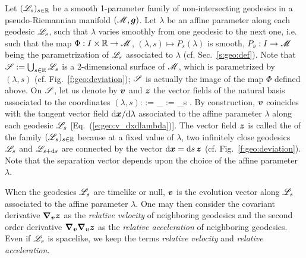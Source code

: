 Let $(\mathscr{L}_s)_{s\in\mathbb{R}}$ be a smooth 1-parameter family of non-intersecting geodesics in a
pseudo-Riemannian manifold $(\mathscr{M},\bm{g})$. Let $\lambda$ be an affine parameter
along each geodesic $\mathscr{L}_s$, such that $\lambda$ varies smoothly from one geodesic to the
next one, i.e. such that the map $\Phi: I\times \mathbb{R}\to \mathscr{M}$,
$(\lambda,s) \mapsto P_s(\lambda)$ is smooth, $P_s: I \to \mathscr{M}$ being the parametrization
of $\mathscr{L}_s$ associated to $\lambda$ (cf. Sec.~\ref{s:geo:def}). Note that
$\mathscr{S} := \bigcup_{s\in\mathbb{R}} \mathscr{L}_s$ is a
2-dimensional surface of $\mathscr{M}$, which is parametrized by $(\lambda,s)$
(cf. Fig.~\ref{f:geo:deviation});
$\mathscr{S}$ is actually the image of the map $\Phi$ defined above. On $\mathscr{S}$,
let us denote by $\bm{v}$ and $\bm{z}$ the vector fields of the natural basis
associated to the coordinates $(\lambda,s)$:
\be
     := \wpar_\lambda   \qand {} := \wpar_s .
\ee
By construction, $\bm{v}$
coincides with the tangent vector field $\mathrm{d}\bm{x}/\mathrm{d}\lambda$ associated to
the affine parameter $\lambda$ along each geodesic $\mathscr{L}_s$ [Eq.~(\ref{e:geo:v_dxdlambda})].
The vector field $\bm{z}$ is called the  of the
family $(\mathscr{L}_s)_{s\in\mathbb{R}}$ because at a fixed value of $\lambda$, two infinitely close geodesics $\mathscr{L}_s$ and $\mathscr{L}_{s + \mathrm{d} s}$ are connected by the vector $\mathrm{d}\bm{x} = \mathrm{d} s \, \bm{z}$
(cf. Fig.~\ref{f:geo:deviation}). Note that the separation vector depends upon the choice of the
affine parameter $\lambda$.

When the geodesics $\mathscr{L}_s$ are timelike or null, $\bm{v}$
is the evolution vector along $\mathscr{L}_s$ associated to the affine parameter $\lambda$.
One may then consider the covariant derivative $\bm{\nabla}_{\bm{v}} \bm{z}$ as
the \emph{relative velocity} of neighboring geodesics and the second order derivative
$\bm{\nabla}_{\bm{v}} \bm{\nabla}_{\bm{v}} \bm{z}$ as the \emph{relative acceleration} of neighboring
geodesics. Even if $\mathscr{L}_s$ is spacelike, we keep the terms \emph{relative velocity}
and \emph{relative acceleration}.

